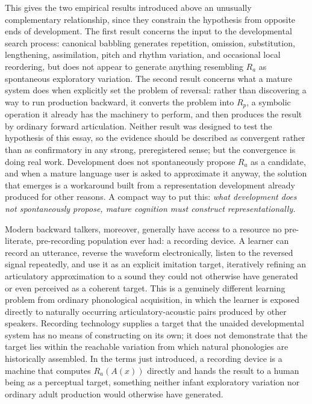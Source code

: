 \documentclass[11pt]{article}
\begin{document}
This gives the two empirical results introduced above an unusually complementary relationship, since they constrain the hypothesis from opposite ends of development. The first result concerns the input to the developmental search process: canonical babbling generates repetition, omission, substitution, lengthening, assimilation, pitch and rhythm variation, and occasional local reordering, but does not appear to generate anything resembling $R_a$ as spontaneous exploratory variation. The second result concerns what a mature system does when explicitly set the problem of reversal: rather than discovering a way to run production backward, it converts the problem into $R_p$, a symbolic operation it already has the machinery to perform, and then produces the result by ordinary forward articulation. Neither result was designed to test the hypothesis of this essay, so the evidence should be described as convergent rather than as confirmatory in any strong, preregistered sense; but the convergence is doing real work. Development does not spontaneously propose $R_a$ as a candidate, and when a mature language user is asked to approximate it anyway, the solution that emerges is a workaround built from a representation development already produced for other reasons. A compact way to put this: \emph{what development does not spontaneously propose, mature cognition must construct representationally.}

Modern backward talkers, moreover, generally have access to a resource no pre-literate, pre-recording population ever had: a recording device. A learner can record an utterance, reverse the waveform electronically, listen to the reversed signal repeatedly, and use it as an explicit imitation target, iteratively refining an articulatory approximation to a sound they could not otherwise have generated or even perceived as a coherent target. This is a genuinely different learning problem from ordinary phonological acquisition, in which the learner is exposed directly to naturally occurring articulatory-acoustic pairs produced by other speakers. Recording technology supplies a target that the unaided developmental system has no means of constructing on its own; it does not demonstrate that the target lies within the reachable variation from which natural phonologies are historically assembled. In the terms just introduced, a recording device is a machine that computes $R_a(A(x))$ directly and hands the result to a human being as a perceptual target, something neither infant exploratory variation nor ordinary adult production would otherwise have generated.
\end{document}
